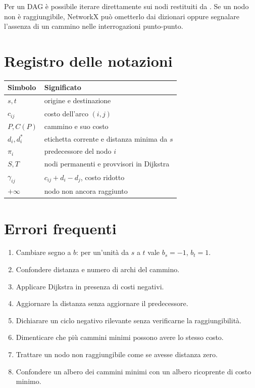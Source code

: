 \documentclass[11pt,a4paper]{article}
\begin{document}
Per un DAG è possibile iterare direttamente sui nodi restituiti da . Se un nodo non è raggiungibile, NetworkX può ometterlo dai dizionari oppure segnalare l'assenza di un cammino nelle interrogazioni punto-punto.

\section{Registro delle notazioni}

\begin{notationbox}
\begin{center}
\begin{tabular}{ll}
\toprule
Simbolo & Significato\\
\midrule
$s,t$ & origine e destinazione\\
$c_{ij}$ & costo dell'arco $(i,j)$\\
$P,C(P)$ & cammino e suo costo\\
$d_i,d_i^*$ & etichetta corrente e distanza minima da $s$\\
$\pi_i$ & predecessore del nodo $i$\\
$S,T$ & nodi permanenti e provvisori in Dijkstra\\
$\gamma_{ij}$ & $c_{ij}+d_i-d_j$, costo ridotto\\
$+\infty$ & nodo non ancora raggiunto\\
\bottomrule
\end{tabular}
\end{center}
\end{notationbox}

\section{Errori frequenti}
\begin{enumerate}
\item Cambiare segno a $b$: per un'unità da $s$ a $t$ vale $b_s=-1$, $b_t=1$.
\item Confondere distanza e numero di archi del cammino.
\item Applicare Dijkstra in presenza di costi negativi.
\item Aggiornare la distanza senza aggiornare il predecessore.
\item Dichiarare un ciclo negativo rilevante senza verificarne la raggiungibilità.
\item Dimenticare che più cammini minimi possono avere lo stesso costo.
\item Trattare un nodo non raggiungibile come se avesse distanza zero.
\item Confondere un albero dei cammini minimi con un albero ricoprente di costo minimo.
\end{enumerate}
\end{document}
